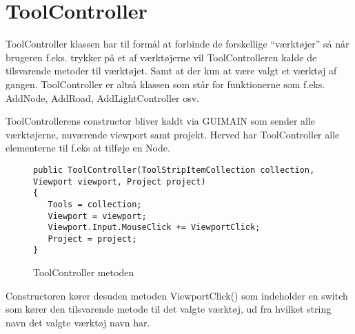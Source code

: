 \section{ToolController}\label{ToolController}

ToolController klassen har til formål at forbinde de forskellige “værktøjer” så når brugeren f.eks. trykker på et af værktøjerne vil ToolControlleren kalde de tilsvarende metoder til værktøjet. Samt at der kun at være valgt et værktøj af gangen. ToolController er altså klassen som står for funktionerne som f.eks. AddNode, AddRoad, AddLightController osv.

\vspace{5mm}

ToolControllerens constructor bliver kaldt via GUIMAIN som sender alle værktøjerne, nuværende viewport samt projekt. Herved har ToolController alle elementerne til f.eks at tilføje en Node.

\begin{figure}[H]
\begin{lstlisting}
public ToolController(ToolStripItemCollection collection, Viewport viewport, Project project)
{
   Tools = collection;
   Viewport = viewport;
   Viewport.Input.MouseClick += ViewportClick;
   Project = project;
}
\end{lstlisting}
\caption{ToolController metoden}\label{ToolControllerCode}
\end{figure}

\vspace{5mm}

Constructoren kører desuden metoden ViewportClick() som indeholder en switch som kører den tilsvarende metode til det valgte værktøj, ud fra hvilket string navn det valgte værktøj navn har.

